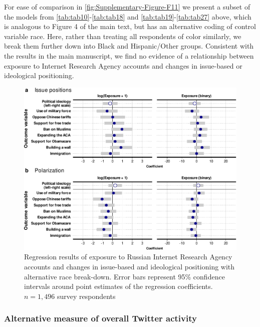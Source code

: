 \documentclass[
  12pt,
]{article}
\begin{document}
For ease of comparison in \autoref{fig:Supplementary-Figure-F11} we present a subset of the models from \ref{tab:tab10}-\ref{tab:tab18} and \ref{tab:tab19}-\ref{tab:tab27} above, which is analogous to Figure 4 of the main text, but has an alternative coding of control variable race. Here, rather than treating all respondents of color similarly, we break them further down into Black and Hispanic/Other groups. Consistent with the results in the main manuscript, we find no evidence of a relationship between exposure to Internet Research Agency accounts and changes in issue-based or ideological positioning.

\begin{figure}
\centering
\includegraphics{Supplementary_Information_files/figure-latex/Supplementary-Figure-F11-1.pdf}
\caption{\label{fig:Supplementary-Figure-F11}Regression results of exposure to Russian Internet Research Agency accounts and changes in issue-based and ideological positioning with alternative race break-down. Error bars represent 95\% confidence intervals around point estimates of the regression coefficients. \(n = 1,496\) survey respondents}
\end{figure}

\clearpage

\hypertarget{alternative-measure-of-overall-twitter-activity-1}{%
\subsubsection{Alternative measure of overall Twitter activity}\label{alternative-measure-of-overall-twitter-activity-1}}
\end{document}
